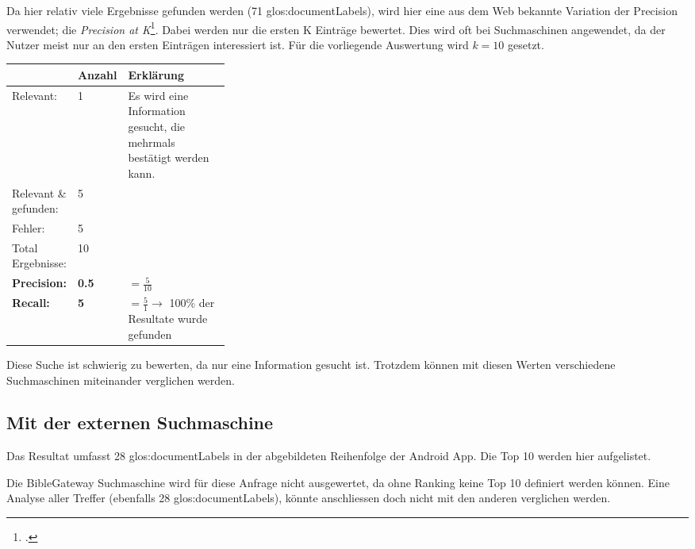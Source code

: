 Da hier relativ viele Ergebnisse gefunden werden (71 \glspl{glos:documentLabel}), wird hier eine aus dem Web bekannte Variation der Precision verwendet; die \textit{Precision at K}\footcite{Information_retrieval_Wikipedia_the_free_encyclopedia_2016-05-11}. Dabei werden nur die ersten K Einträge bewertet. Dies wird oft bei Suchmaschinen angewendet, da der Nutzer meist nur an den ersten Einträgen interessiert ist.
Für die vorliegende Auswertung wird $k = 10$ gesetzt.

\begin{table}[H]
	\centering
	\small\renewcommand{\arraystretch}{1.4}
	\begin{tabularx}{0.9\textwidth}{ L{0.22\linewidth} | L{0.1\linewidth} | X }%
		\hline
		& Anzahl & Erklärung \\ \hline \hline
		Relevant: & 1 & Es wird eine Information gesucht, die mehrmals bestätigt werden kann.\\
		Relevant \& gefunden: & 5 & \\
		Fehler: & 5 & \\
		Total Ergebnisse: & 10 & \\
		\hline
		\textbf{Precision:} & \textbf{0.5} & $= \frac{5}{10}$ \\
		\textbf{Recall:} & \textbf{5} & $= \frac{5}{1} \rightarrow$ 100\% der Resultate wurde gefunden\\
		\hline\hline
	\end{tabularx}
\end{table}

Diese Suche ist schwierig zu bewerten, da nur eine Information gesucht ist. Trotzdem können mit diesen Werten verschiedene Suchmaschinen miteinander verglichen werden.


\subsection{Mit der externen Suchmaschine}
Das Resultat umfasst 28 \glspl{glos:documentLabel} in der abgebildeten Reihenfolge der Android App.
Die Top 10 werden hier aufgelistet.

Die BibleGateway Suchmaschine wird für diese Anfrage nicht ausgewertet, da ohne Ranking keine Top 10 definiert werden können. Eine Analyse aller Treffer (ebenfalls 28 \glspl{glos:documentLabel}), könnte anschliessen doch nicht mit den anderen verglichen werden.

